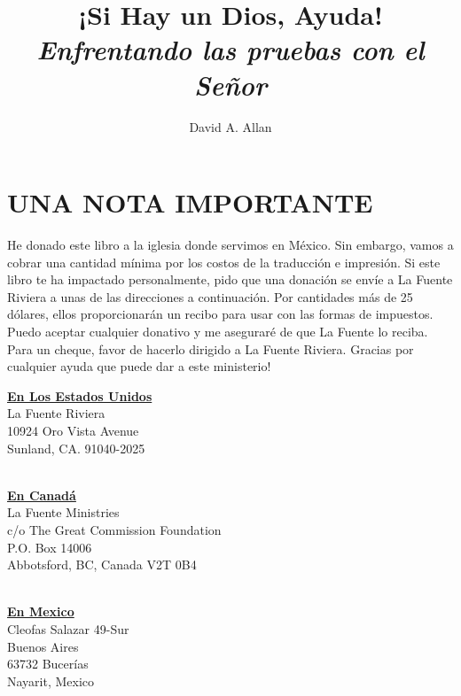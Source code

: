 \documentclass[twoside, 12pt]{book}
\begin{document}
\let\cleardoublepage\clearpage 
\frontmatter
\title{
	\fontsize{48}{57.6}\selectfont ¡Si Hay un Dios, Ayuda!\\
	\textit{\fontsize{16}{19.2}\selectfont Enfrentando las pruebas con el Señor}
}
\author{\fontsize{24}{28.8}\selectfont David A. Allan}
\date{}
\maketitle

\chapter*{UNA NOTA IMPORTANTE}
He donado este libro a la iglesia donde servimos en México.  Sin embargo, vamos a cobrar una cantidad mínima por los costos de la traducción e impresión.  Si este libro te ha impactado personalmente, pido que una donación se envíe a La Fuente Riviera a unas de las direcciones a continuación.  Por cantidades más de 25 dólares, ellos proporcionarán un recibo para usar con las formas de impuestos. Puedo aceptar cualquier donativo y me aseguraré de que La Fuente lo reciba. Para un cheque, favor de hacerlo dirigido a La Fuente Riviera.  Gracias por cualquier ayuda que puede dar a este ministerio!\\
\clearpage

\begin{center}
\underline{\textbf{En Los Estados Unidos}}\\
La Fuente Riviera\\
10924 Oro Vista Avenue\\
Sunland, CA. 91040-2025\\
\

\underline{\textbf{En Canadá}}\\
La Fuente Ministries\\
c/o The Great Commission Foundation\\
P.O. Box 14006\\
Abbotsford, BC, Canada V2T 0B4\\
\

\underline{\textbf{En Mexico}}\\
Cleofas Salazar 49-Sur\\
Buenos Aires\\
63732 Bucerías\\
Nayarit, Mexico\\
\

\end{center}
\end{document}
